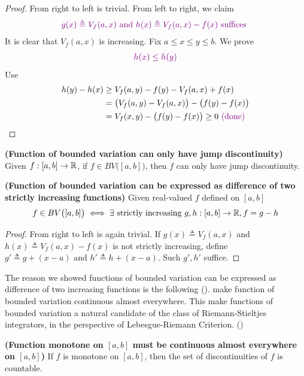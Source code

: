 \documentclass{report}
\begin{document}
\begin{proof}
From right to left is trivial. From left to right, we claim 
\begin{align*}
  \textcolor{violet}{g(x)\triangleq V_f(a,x)\text{ and }h(x)\triangleq V_f(a,x)-f(x)\text{ suffices }}
\end{align*}
It is clear that $V_f(a,x)$ is increasing. Fix $a\leq x\leq y\leq b$. We prove
\begin{align*}
  \textcolor{violet}{h(x)\leq h(y)}
\end{align*}
Use  
\begin{align*}
  h(y)-h(x)&\geq V_f(a,y)-f(y) - V_f(a,x) + f(x)\\
  &= \big(V_f(a,y)-V_f(a,x) \big)- \big(f(y)-f(x) \big)\\
  &=V_f(x,y)-\big(f(y)-f(x) \big)\geq 0 \textcolor{violet}{\text{ (done) }}
\end{align*}
\end{proof}
\begin{corollary}
\label{Fobj}
\textbf{(Function of bounded variation can only have jump discontinuity)} Given $f:[a,b]\rightarrow \mathbb{R}$, if $f \in BV\big([a,b] \big)$, then $f$ can only have jump discontinuity.
\end{corollary}
\begin{corollary}
\label{Fobi}
\textbf{(Function of bounded variation can be expressed as difference of two strictly increasing functions)} Given real-valued $f$ defined on  $[a,b]$ 
\begin{align*}
f\in BV\big([a,b] \big)\iff \exists \text{ strictly increasing }g,h:[a,b]\rightarrow \mathbb{R}, f=g-h
\end{align*}
\end{corollary}
\begin{proof}
From right to left is again trivial. If $g(x)\triangleq V_f(a,x)$ and $h(x)\triangleq V_f(a,x)-f(x)$ is not strictly increasing, define $g'\triangleq g+(x-a)\text{ and }h'\triangleq h+(x-a)$. Such $g',h'$ suffice.
\end{proof}
\begin{mdframed}
The reason we showed functions of bounded variation can be expressed as difference of two increasing functions is the following  ().  make function of bounded variation continuous almost everywhere. This make functions of bounded variation a natural candidate of the class of Riemann-Stieltjes integrators, in the perspective of Lebesgue-Riemann Criterion. ()
\end{mdframed}
\begin{theorem}
\label{Fmo}
\textbf{(Function monotone on $[a,b]$ must be continuous almost everywhere on $[a,b]$)} If $f$ is monotone on $[a,b]$, then the set of discontinuities of $f$ is countable.
\end{theorem}
\end{document}
